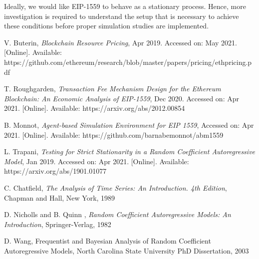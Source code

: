 \documentclass{article}
\begin{document}
Ideally, we would like EIP-1559 to behave as a stationary process. Hence, more investigation is required to understand the setup that is necessary to achieve these conditions before proper simulation studies are implemented.

\begin{thebibliography}{1}

 V. Buterin,  \textit{Blockchain Resource Pricing}, Apr 2019. Accessed on: May 2021. [Online]. Available: https://github.com/ethereum/research/blob/master/papers/pricing/ethpricing.pdf

 T. Roughgarden, \textit{Transaction Fee Mechanism Design for the Ethereum Blockchain: An Economic Analysis of EIP-1559}, Dec 2020. Accessed on: Apr 2021. [Online]. Available: https://arxiv.org/abs/2012.00854

 B. Monnot, \textit{Agent-based Simulation Environment for EIP 1559}, Accessed on: Apr 2021.  [Online]. Available:  https://github.com/barnabemonnot/abm1559

 L. Trapani, \textit{Testing for Strict Stationarity in a Random Coefficient Autoregressive Model}, Jan 2019. Accessed on: Apr 2021. [Online]. Available: https://arxiv.org/abs/1901.01077

 C. Chatfield, \textit{The Analysis of Time Series: An Introduction. 4th Edition}, Chapman and Hall, New York, 1989

 D. Nicholls and B. Quinn , \textit{Random Coefficient Autoregressive Models: An Introduction}, Springer-Verlag, 1982

 D. Wang, Frequentist and Bayesian Analysis of Random Coefficient Autoregressive Models, North Carolina State University PhD Dissertation, 2003



\end{thebibliography}
\end{document}
